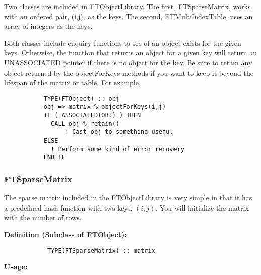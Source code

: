 \documentclass[9pt]{article}
\begin{document}
Two classes are included in FTObjectLibrary. The first, FTSparseMatrix, works with an ordered pair, (i,j), as the
keys. The second, FTMultiIndexTable, uses an array of integers as the keys.

Both classes include enquiry functions to see of an object exists for the given keys. Otherwise,
the function that returns an object for a given key will return an UNASSOCIATED pointer if there
is no object for the key. Be sure to retain any object returned by the objectForKeys methods if 
you want to keep it beyond the lifespan of the matrix or table. For example,

	{\color{blue}\begin{verbatim}
           TYPE(FTObject) :: obj
           obj => matrix % objectForKeys(i,j)
           IF ( ASSOCIATED(OBJ) ) THEN
           	 CALL obj % retain()
	             ! Cast obj to something useful
           ELSE
             ! Perform some kind of error recovery
           END IF 
        	\end{verbatim}}



\subsubsection{FTSparseMatrix}
The sparse matrix included in the FTObjectLibrary is very simple in that it has a predefined
hash function with two keys, $(i,j)$. You will initialize the matrix
with the number of rows.

     {\bf Definition (Subclass of FTObject):}
	{\color{blue}\begin{verbatim}
        	TYPE(FTSparseMatrix) :: matrix
	\end{verbatim}}
     {\bf Usage:}
\end{document}
